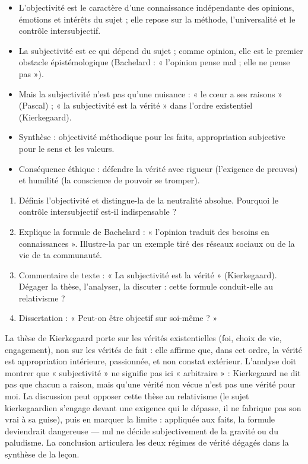 \documentclass[11pt]{article}
\newcommand{\cle}[1]{{\popxbold\color{popdark}#1}}
\begin{document}
\begin{aretenir}
\begin{itemize}
\item L'\cle{objectivité} est le caractère d'une connaissance indépendante des opinions, émotions et intérêts du sujet ; elle repose sur la méthode, l'universalité et le contrôle intersubjectif.
\item La \cle{subjectivité} est ce qui dépend du sujet ; comme opinion, elle est le premier obstacle épistémologique (Bachelard : « l'opinion pense mal ; elle ne pense pas »).
\item Mais la subjectivité n'est pas qu'une nuisance : « le cœur a ses raisons » (Pascal) ; « la subjectivité est la vérité » dans l'ordre existentiel (Kierkegaard).
\item Synthèse : objectivité méthodique pour les faits, appropriation subjective pour le sens et les valeurs.
\item Conséquence éthique : défendre la vérité avec rigueur (l'exigence de preuves) et humilité (la conscience de pouvoir se tromper).
\end{itemize}
\end{aretenir}

\begin{exercice}
\begin{enumerate}
\item Définis l'objectivité et distingue-la de la neutralité absolue. Pourquoi le contrôle intersubjectif est-il indispensable ?
\item Explique la formule de Bachelard : « l'opinion traduit des besoins en connaissances ». Illustre-la par un exemple tiré des réseaux sociaux ou de la vie de ta communauté.
\item Commentaire de texte : « La subjectivité est la vérité » (Kierkegaard). Dégager la thèse, l'analyser, la discuter : cette formule conduit-elle au relativisme ?
\item Dissertation : « Peut-on être objectif sur soi-même ? »
\end{enumerate}
\end{exercice}

\begin{corrige}
La thèse de Kierkegaard porte sur les vérités existentielles (foi, choix de vie, engagement), non sur les vérités de fait : elle affirme que, dans cet ordre, la vérité est appropriation intérieure, passionnée, et non constat extérieur. L'analyse doit montrer que « subjectivité » ne signifie pas ici « arbitraire » : Kierkegaard ne dit pas que chacun a raison, mais qu'une vérité non vécue n'est pas une vérité pour moi. La discussion peut opposer cette thèse au relativisme (le sujet kierkegaardien s'engage devant une exigence qui le dépasse, il ne fabrique pas son vrai à sa guise), puis en marquer la limite : appliquée aux faits, la formule deviendrait dangereuse — nul ne décide subjectivement de la gravité ou du paludisme. La conclusion articulera les deux régimes de vérité dégagés dans la synthèse de la leçon.
\end{corrige}
\end{document}
